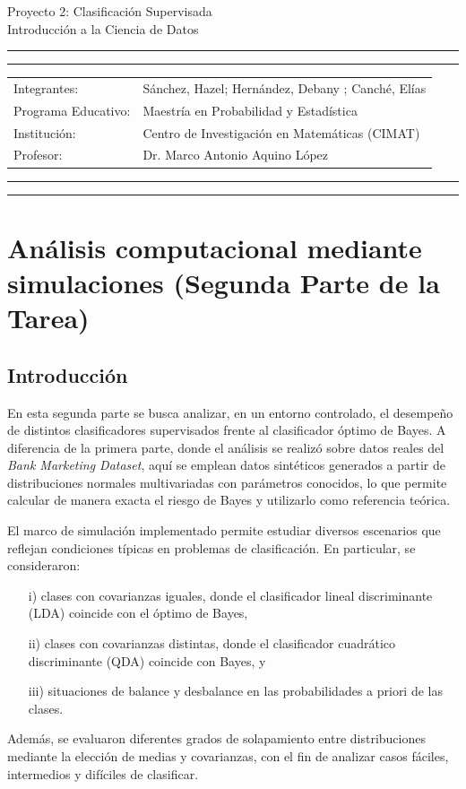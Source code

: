 \documentclass[10pt]{article}
\newcommand{\studentname}{Sánchez, Hazel; Hernández, Debany ; Canché, Elías}
\newcommand{\researchcentre}{Maestría en Probabilidad y Estadística}
\newcommand{\institution}{Centro de Investigación en Matemáticas (CIMAT)}
\newcommand{\supervisor}{Dr. Marco Antonio Aquino López}
\begin{document}
\begin{center}
{\Large{Proyecto 2: Clasificación Supervisada}} \\
\vspace{2mm}
{\Large{Introducción a la Ciencia de Datos}} \\
\end{center}

\vspace{5mm}
\hrule
\vspace{1mm}
\hrule

\vspace{3mm}
\begin{tabular}{ll} 
Integrantes:           	        & {\studentname}   \\ 
Programa Educativo: 	        & {\researchcentre}  \\ 
Institución:                 & {\institution}  \\
Profesor: 	                 & {\supervisor}  \\ 
\end{tabular}

\vspace{3mm}
\hrule
\vspace{1mm}
\hrule


\section{Análisis computacional mediante simulaciones (Segunda Parte de la Tarea)}

\subsection*{Introducción}


En esta segunda parte se busca analizar, en un entorno controlado, el desempeño de distintos clasificadores supervisados frente al clasificador óptimo de Bayes. A diferencia de la primera parte, donde el análisis se realizó sobre datos reales del \textit{Bank Marketing Dataset}, aquí se emplean datos sintéticos generados a partir de distribuciones normales multivariadas con parámetros conocidos, lo que permite calcular de manera exacta el riesgo de Bayes y utilizarlo como referencia teórica.

El marco de simulación implementado permite estudiar diversos escenarios que reflejan condiciones típicas en problemas de clasificación. En particular, se consideraron: 
\begin{itemize}
\item[i)] clases con covarianzas iguales, donde el clasificador lineal discriminante (LDA) coincide con el óptimo de Bayes, 

\item[ii)] clases con covarianzas distintas, donde el clasificador cuadrático discriminante (QDA) coincide con Bayes, y 

\item[iii)] situaciones de balance y desbalance en las probabilidades a priori de las clases. 
\end{itemize}
Además, se evaluaron diferentes grados de solapamiento entre distribuciones mediante la elección de medias y covarianzas, con el fin de analizar casos fáciles, intermedios y difíciles de clasificar.
\end{document}
